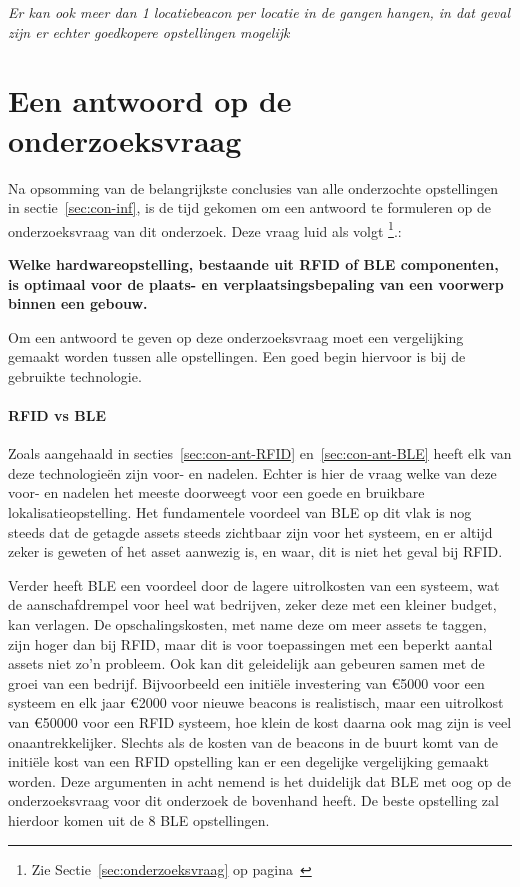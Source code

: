 \emph{Er kan ook meer dan 1 locatiebeacon per locatie in de gangen hangen, in dat geval zijn er echter goedkopere opstellingen mogelijk}

\section{Een antwoord op de onderzoeksvraag}
\label{sec:con-ant}
Na opsomming van de belangrijkste conclusies van alle onderzochte opstellingen in sectie~\ref{sec:con-inf}, is de tijd gekomen om een antwoord te formuleren op de onderzoeksvraag van dit onderzoek. Deze vraag luid als volgt \footnote{Zie Sectie~\ref{sec:onderzoeksvraag} op pagina~\pageref{sec:onderzoeksvraag}}.:
\begin{center}
	\textbf{Welke hardwareopstelling, bestaande uit RFID of BLE componenten, is optimaal voor de plaats- en verplaatsingsbepaling van een voorwerp binnen een gebouw.}
\end{center}

Om een antwoord te geven op deze onderzoeksvraag moet een vergelijking gemaakt worden tussen alle opstellingen. Een goed begin hiervoor is bij de gebruikte technologie.

\paragraph{RFID vs BLE}
Zoals aangehaald in secties~\ref{sec:con-ant-RFID} en~\ref{sec:con-ant-BLE} heeft elk van deze technologieën zijn voor- en nadelen. Echter is hier de vraag welke van deze voor- en nadelen het meeste doorweegt voor een goede en bruikbare lokalisatieopstelling. 
Het fundamentele voordeel van BLE op dit vlak is nog steeds dat de getagde assets steeds zichtbaar zijn voor het systeem, en er altijd zeker is geweten of het asset aanwezig is, en waar, dit is niet het geval bij RFID. 

Verder heeft BLE een voordeel door de lagere uitrolkosten van een systeem, wat de aanschafdrempel voor heel wat bedrijven, zeker deze met een kleiner budget, kan verlagen. De opschalingskosten, met name deze om meer assets te taggen, zijn hoger dan bij RFID, maar dit is voor toepassingen met een beperkt aantal assets niet zo'n probleem. Ook kan dit geleidelijk aan gebeuren samen met de groei van een bedrijf. Bijvoorbeeld een initiële investering van €5000 voor een systeem en elk jaar €2000 voor nieuwe beacons is realistisch, maar een uitrolkost van €50000 voor een RFID systeem, hoe klein de kost daarna ook mag zijn is veel onaantrekkelijker. Slechts als de kosten van de beacons in de buurt komt van de initiële kost van een RFID opstelling kan er een degelijke vergelijking gemaakt worden. Deze argumenten in acht nemend is het duidelijk dat BLE met oog op de onderzoeksvraag voor dit onderzoek de bovenhand heeft. De beste opstelling zal hierdoor komen uit de 8 BLE opstellingen.

